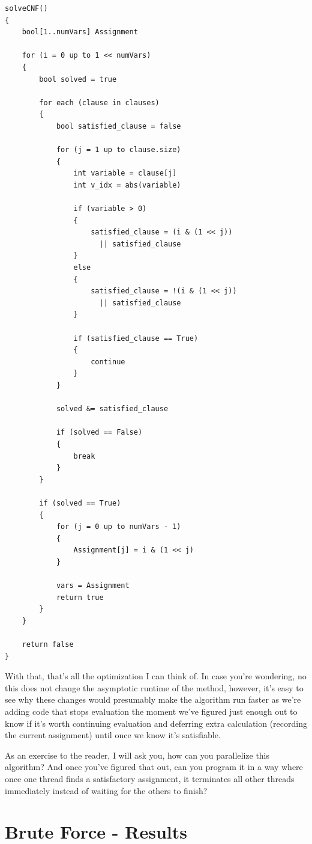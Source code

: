 \documentclass[oneside]{book}
\begin{document}
\begin{lstlisting}
solveCNF()
{
    bool[1..numVars] Assignment

    for (i = 0 up to 1 << numVars)
    {
        bool solved = true

        for each (clause in clauses)
        {
            bool satisfied_clause = false

            for (j = 1 up to clause.size)
            {
                int variable = clause[j]
                int v_idx = abs(variable)

                if (variable > 0)
                {
                    satisfied_clause = (i & (1 << j)) 
                      || satisfied_clause
                }
                else
                {
                    satisfied_clause = !(i & (1 << j))
                      || satisfied_clause
                }

                if (satisfied_clause == True)
                {
                    continue
                }
            }

            solved &= satisfied_clause

            if (solved == False)
            {
                break
            }
        }

        if (solved == True)
        {
            for (j = 0 up to numVars - 1)
            {
                Assignment[j] = i & (1 << j)
            }

            vars = Assignment
            return true
        }
    }

    return false
}
\end{lstlisting}

With that, that's all the optimization I can think of. In case you're
wondering, no this does not change the asymptotic runtime of the method,
however, it's easy to see why these changes would presumably make the
algorithm run faster as we're adding code that stops evaluation the moment
we've figured just enough out to know if it's worth continuing evaluation and
deferring extra calculation (recording the current assignment) until once we
know it's satisfiable.

As an exercise to the reader, I will ask you, how can you parallelize this
algorithm? And once you've figured that out, can you program it in a way
where once one thread finds a satisfactory assignment, it terminates all other
threads immediately instead of waiting for the others to finish?

\section{Brute Force - Results}
\end{document}

